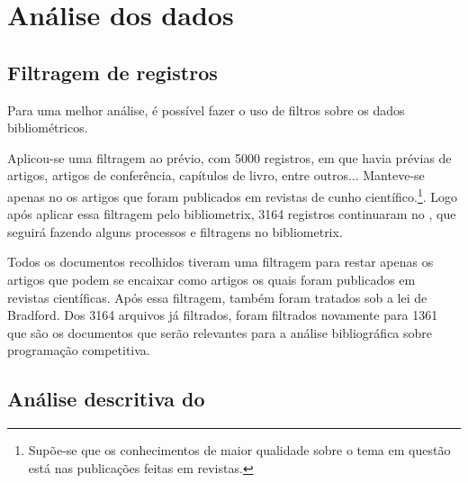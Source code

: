 \section{Análise dos dados}

\subsection{Filtragem de registros}
Para uma melhor análise, é possível fazer o uso de filtros sobre os dados bibliométricos.

Aplicou-se uma filtragem ao \dataset prévio, com 5000 registros, em que havia prévias de artigos, artigos de conferência, capítulos de livro, entre outros... Manteve-se apenas no \dataset os artigos que foram publicados em revistas de cunho científico.\footnote{Supõe-se que os conhecimentos de maior qualidade sobre o tema em questão está nas publicações feitas em revistas.}.  Logo após aplicar essa filtragem pelo bibliometrix, 3164 registros continuaram no \dataset, que seguirá fazendo alguns processos e filtragens no bibliometrix.

Todos os documentos recolhidos tiveram uma filtragem para restar apenas os artigos que podem se encaixar como artigos os quais foram publicados em revistas científicas. Após essa filtragem, também foram tratados sob a lei de Bradford. Dos 3164 arquivos já filtrados, foram filtrados novamente para 1361 que são os documentos que serão relevantes para a análise bibliográfica sobre programação competitiva.

\subsection{Análise descritiva do \dataset\   }

